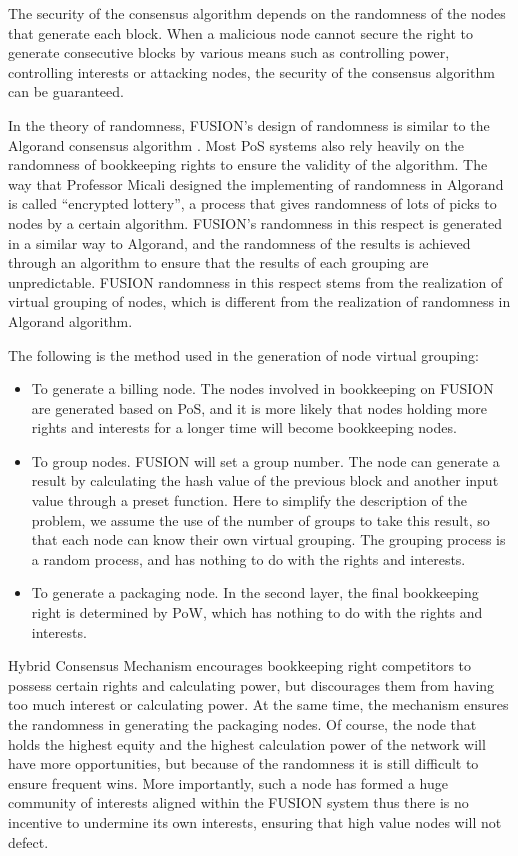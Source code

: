 \documentclass[a4paper,12pt]{article}
\begin{document}
The security of the consensus algorithm depends on the randomness of the nodes that generate each block. When a malicious node cannot secure the right to generate consecutive blocks by various means such as controlling power, controlling interests or attacking nodes, the security of the consensus algorithm can be guaranteed.

In the theory of randomness, FUSION's design of randomness is similar to the Algorand consensus algorithm \citep {Jing2017}. Most PoS systems also rely heavily on the randomness of bookkeeping rights to ensure the validity of the algorithm. The way that Professor Micali designed the implementing of randomness in Algorand is called “encrypted lottery”, a process that gives randomness of lots of picks to nodes by a certain algorithm. FUSION's randomness in this respect is generated in a similar way to Algorand, and the randomness of the results is achieved through an algorithm to ensure that the results of each grouping are unpredictable. FUSION randomness in this respect stems from the realization of virtual grouping of nodes, which is different from the realization of randomness in Algorand algorithm.

The following is the method used in the generation of node virtual grouping:

\begin {itemize} [itemindent = 1em]
\item To generate a billing node. The nodes involved in bookkeeping on FUSION are generated based on PoS, and it is more likely that nodes holding more rights and interests for a longer time will become bookkeeping nodes.
\item To group nodes. FUSION will set a group number. The node can generate a result by calculating the hash value of the previous block and another input value through a preset function. Here to simplify the description of the problem, we assume the use of the number of groups to take this result, so that each node can know their own virtual grouping. The grouping process is a random process, and has nothing to do with the rights and interests.
\item To generate a packaging node. In the second layer, the final bookkeeping right is determined by PoW, which has nothing to do with the rights and interests.
\end {itemize}

Hybrid Consensus Mechanism encourages bookkeeping right competitors to possess certain rights and calculating power, but discourages them from having too much interest or calculating power. At the same time, the mechanism ensures the randomness in generating the packaging nodes. Of course, the node that holds the highest equity and the highest calculation power of the network will have more opportunities, but because of the randomness it is still difficult to ensure frequent wins. More importantly, such a node has formed a huge community of interests aligned within the FUSION system thus there is no incentive to undermine its own interests, ensuring that high value nodes will not defect.
\end{document}
